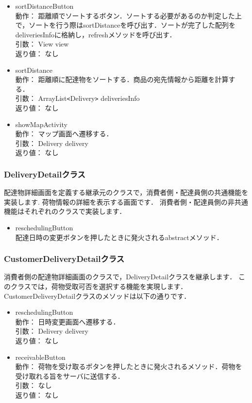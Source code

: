 \documentclass[a4j,titlepage]{jarticle}
\begin{document}
\begin{itemize}
\item sortDistanceButton\\
動作： 距離順でソートするボタン．ソートする必要があるのか判定した上で，ソートを行う際はsortDistanceを呼び出す．ソートが完了した配列をdeliveriesInfoに格納し，refreshメソッドを呼び出す．\\
引数： View view\\
返り値： なし

\item sortDistance\\
動作： 距離順に配達物をソートする．商品の宛先情報から距離を計算する．\\
引数： ArrayList\verb|<|Delivery\verb|>| deliveriesInfo\\
返り値： なし

\item showMapActivity\\
動作： マップ画面へ遷移する．\\
引数： Delivery delivery\\
返り値： なし
\end{itemize}

\subsubsection{DeliveryDetailクラス}
配達物詳細画面を定義する継承元のクラスで，消費者側・配達員側の共通機能を実装します.
荷物情報の詳細を表示する画面です．
 消費者側・配達員側の非共通機能はそれぞれのクラスで実装します．
 
\begin{itemize}
\item reschedulingButton\\
 配達日時の変更ボタンを押したときに発火されるabstractメソッド．\\
\end{itemize}

\subsubsection{CustomerDeliveryDetailクラス}
消費者側の配達物詳細画面のクラスで，DeliveryDetailクラスを継承します．
このクラスでは，荷物受取可否を選択する機能を実現します．
CustomerDeliveryDetailクラスのメソッドは以下の通りです．
\begin{itemize}
\item reschedulingButton\\
動作： 日時変更画面へ遷移する．\\
引数： Delivery delivery\\
返り値： なし

\item receivableButton\\
動作： 荷物を受け取るボタンを押したときに発火されるメソッド．荷物を受け取れる旨をサーバに送信する．\\
引数： なし\\
返り値： なし
\end{itemize}
\end{document}
